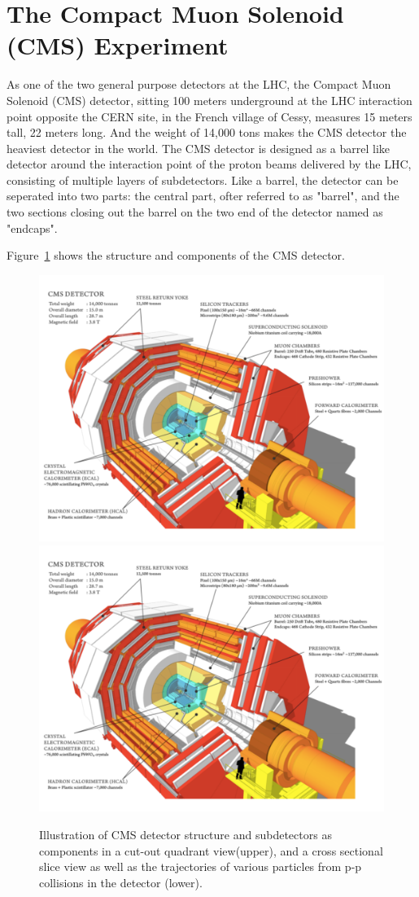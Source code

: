 \section{The Compact Muon Solenoid (CMS) Experiment}
As one of the two general purpose detectors at the LHC, the Compact Muon Solenoid (CMS) detector\cite{lhc_cmsatcern}, sitting 100 meters underground at the LHC interaction point opposite the CERN site, in the French village of Cessy, measures 15 meters tall, 22 meters long. And the weight of 14,000 tons makes the CMS detector the heaviest detector in the world. The CMS detector is designed as a barrel like detector around the interaction point of the proton beams delivered by the LHC, consisting of multiple layers of subdetectors. Like a barrel, the detector can be seperated into two parts: the central part, ofter referred to as "barrel", and the two sections closing out the barrel on the two end of the detector named as "endcaps". 

Figure~\ref{fig:lhc_cmsstructure} shows the structure and components of the CMS detector.
\begin{figure}[htbp]
\begin{center}
\includegraphics[width=0.7\linewidth, page=1]{figures/lhc_cmsstructure.pdf}
\includegraphics[width=0.7\linewidth, page=2]{figures/lhc_cmsstructure.pdf}
\caption{Illustration of CMS detector structure and subdetectors as components in a cut-out quadrant view(upper), and a cross sectional slice view as well as the trajectories of various particles from p-p collisions in the detector (lower).}
\label{fig:lhc_cmsstructure}
\end{center}
\end{figure}

